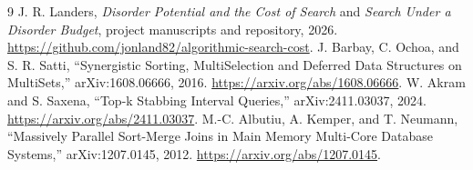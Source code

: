 \documentclass[10pt,letterpaper]{article}
\begin{document}
\begin{thebibliography}{9}\small
{} J. R. Landers, \emph{Disorder Potential and the Cost of Search} and \emph{Search Under a Disorder Budget}, project manuscripts and repository, 2026. \url{https://github.com/jonland82/algorithmic-search-cost}.
 J. Barbay, C. Ochoa, and S. R. Satti, ``Synergistic Sorting, MultiSelection and Deferred Data Structures on MultiSets,'' arXiv:1608.06666, 2016. \url{https://arxiv.org/abs/1608.06666}.
 W. Akram and S. Saxena, ``Top-k Stabbing Interval Queries,'' arXiv:2411.03037, 2024. \url{https://arxiv.org/abs/2411.03037}.
 M.-C. Albutiu, A. Kemper, and T. Neumann, ``Massively Parallel Sort-Merge Joins in Main Memory Multi-Core Database Systems,'' arXiv:1207.0145, 2012. \url{https://arxiv.org/abs/1207.0145}.
\end{thebibliography}
\end{document}
